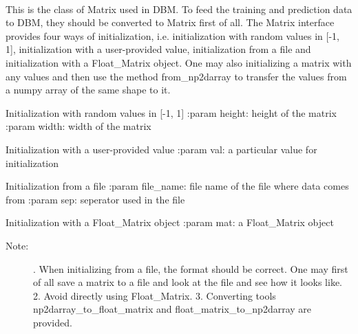 \documentclass[letterpaper,10pt,english]{sphinxmanual}
\begin{document}
\begin{fulllineitems}
\label{\detokenize{index:dbm_py.interface.Matrix}}~

\begin{fulllineitems}
\label{\detokenize{index:dbm_py.interface.Matrix.__init__}}
This is the class of Matrix used in DBM. To feed the training
and prediction data to DBM, they should be converted to
Matrix first of all. The Matrix interface provides four ways
of initialization, i.e. initialization with random values in
{[}-1, 1{]}, initialization with a user-provided value,
initialization from a file and initialization with a
Float\_Matrix object. One may also initializing a matrix with
any values and then use the method from\_np2darray to transfer
the values from a numpy array of the same shape to it.

Initialization with random values in {[}-1, 1{]}
:param height: height of the matrix
:param width: width of the matrix

Initialization with a user-provided value
:param val: a particular value for initialization

Initialization from a file
:param file\_name: file name of the file where data comes from
:param sep: seperator used in the file

Initialization with a Float\_Matrix object
:param mat: a Float\_Matrix object
\begin{description}
\item[{Note:}] . When initializing from a file, the format should be
correct. One may first of all save a matrix to a file
and look at the file and see how it looks like.
2. Avoid directly using Float\_Matrix.
3. Converting tools np2darray\_to\_float\_matrix and
float\_matrix\_to\_np2darray are provided.

\end{description}

\end{fulllineitems}



\end{fulllineitems}
\end{document}
